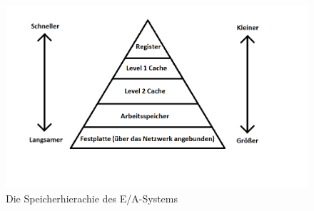 \documentclass[
	twoside,
	12pt,
	a4paper,
	BCOR10mm,
	DIV14,
	listof=totoc,
	bibliography=totoc,
	headsepline
]{scrreprt}
\begin{document}
\begin{figure}[h]
	\begin{center}
		\includegraphics[height=.35\textwidth]{Bilder/hierachie.png}
	\end{center}
	\vspace*{-1cm}
	\caption{Die Speicherhierachie des E/A-Systems}
	\label{fig:mem_hierachie}
\end{figure}
\end{document}
